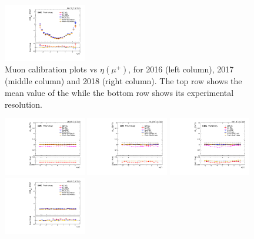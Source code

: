 \begin{figure}[!htb]
      \includegraphics[width=0.32\textwidth]{pics/muon_corr/muon_cal/2018/muP_eta_summary_reso.pdf}
      \caption{Muon calibration plots vs $\eta(\mu^{+})$, for 2016 (left column), 2017 (middle column) and 2018 (right column).
               The top row shows the mean value of the \mmm while the bottom row shows its experimental resolution.}
      \label{fig:mucal_muP_eta}
\end{figure}


\begin{figure}[!htb]
      \centering
      \captionsetup{justification=justified}
      \includegraphics[width=0.32\textwidth]{pics/muon_corr/muon_cal/2016/muP_phi_summary_mean.pdf}
      \includegraphics[width=0.32\textwidth]{pics/muon_corr/muon_cal/2017/muP_phi_summary_mean.pdf}
      \includegraphics[width=0.32\textwidth]{pics/muon_corr/muon_cal/2018/muP_phi_summary_mean.pdf}
      \includegraphics[width=0.32\textwidth]{pics/muon_corr/muon_cal/2016/muP_phi_summary_reso.pdf}

\end{figure}
